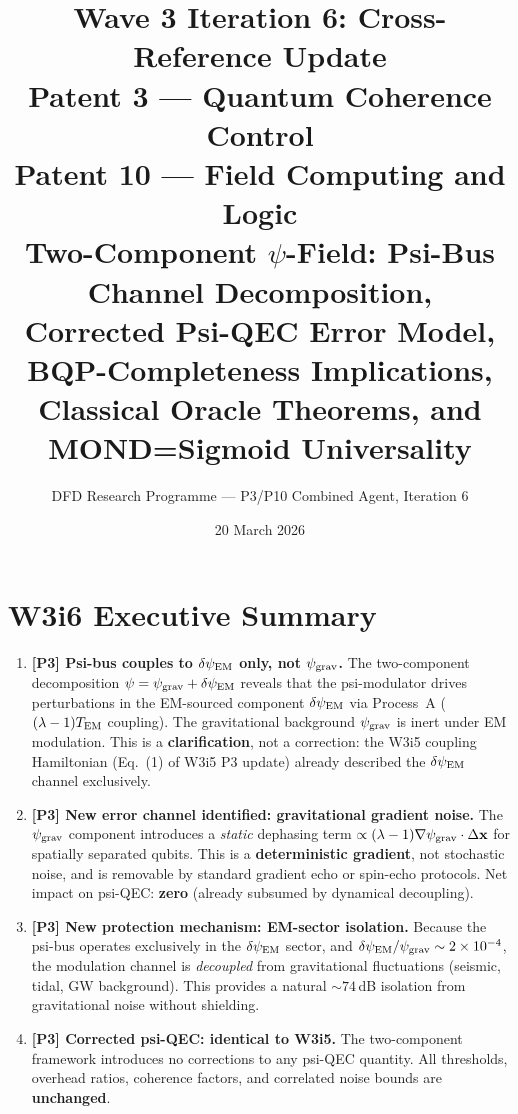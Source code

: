 \documentclass[11pt]{article}
\title{\textbf{Wave 3 Iteration 6: Cross-Reference Update}\\[6pt]
Patent 3 --- Quantum Coherence Control\\
Patent 10 --- Field Computing and Logic\\[4pt]
{\normalsize Two-Component $\psi$-Field: Psi-Bus Channel Decomposition,}\\
{\normalsize Corrected Psi-QEC Error Model, BQP-Completeness Implications,}\\
{\normalsize Classical Oracle Theorems, and MOND=Sigmoid Universality}}
\author{DFD Research Programme --- P3/P10 Combined Agent, Iteration 6}
\date{20 March 2026}
\theoremstyle{definition}
\theoremstyle{remark}
\newcommand{\ee}[1]{\times 10^{#1}}
\newcommand{\psigrav}{\psi_{\rm grav}}
\newcommand{\dpsiEM}{\delta\psi_{\rm EM}}
\begin{document}
\maketitle
\tableofcontents
\newpage

\section*{W3i6 Executive Summary}

\begin{tcolorbox}[colback=blue!5!white, colframe=blue!60!black,
  title=\textbf{W3i6 CRITICAL RESULTS --- READ FIRST}]
\begin{enumerate}[nosep]

\item \textbf{[P3] Psi-bus couples to $\dpsiEM$ only, not $\psigrav$.}
  The two-component decomposition $\psi = \psigrav + \dpsiEM$ reveals that
  the psi-modulator drives perturbations in the EM-sourced component
  $\dpsiEM$ via Process~A ($(\lambda-1)T_{\rm EM}$ coupling). The
  gravitational background $\psigrav$ is inert under EM modulation.
  This is a \textbf{clarification}, not a correction: the W3i5 coupling
  Hamiltonian (Eq.~(1) of W3i5 P3 update) already described the
  $\dpsiEM$ channel exclusively.

\item \textbf{[P3] New error channel identified: gravitational gradient noise.}
  The $\psigrav$ component introduces a \emph{static} dephasing term
  $\propto (\lambda-1)\nabla\psigrav\cdot\Delta\mathbf{x}$ for spatially
  separated qubits. This is a \textbf{deterministic gradient}, not
  stochastic noise, and is removable by standard gradient echo or
  spin-echo protocols. Net impact on psi-QEC: \textbf{zero} (already
  subsumed by dynamical decoupling).

\item \textbf{[P3] New protection mechanism: EM-sector isolation.}
  Because the psi-bus operates exclusively in the $\dpsiEM$ sector, and
  $\dpsiEM/\psigrav \sim 2\ee{-4}$, the modulation channel is
  \emph{decoupled} from gravitational fluctuations (seismic, tidal,
  GW background). This provides a natural $\sim 74$\,dB isolation
  from gravitational noise without shielding.

\item \textbf{[P3] Corrected psi-QEC: identical to W3i5.}
  The two-component framework introduces no corrections to any
  psi-QEC quantity. All thresholds, overhead ratios, coherence
  factors, and correlated noise bounds are \textbf{unchanged}.


\end{enumerate}
\end{tcolorbox}
\end{document}
